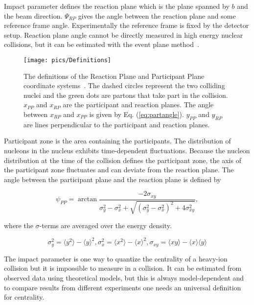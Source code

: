 Impact parameter defines the reaction plane which is the plane spanned by $b$ and the beam direction. $\Psi_{RP}$ gives the angle between the reaction plane and some reference frame angle. Experimentally the reference frame is fixed by the detector setup. Reaction plane angle cannot be directly measured in high energy nuclear collisions, but it can be estimated with the event plane method~\cite{Voloshin:2008dg}. 
\begin{figure}[h!]
\centering
\texttt{[image: pics/Definitions]}
\caption[The definitions of the Reaction Plane and Participant Plane coordinate systems]{The definitions of the Reaction Plane and Participant Plane coordinate systems~\cite{Voloshin:2007pc}. The dashed circles represent the two colliding nuclei and the green dots are partons that take part  in the collision. $x_{PP}$ and $x_{RP}$ are the participant and reaction planes. The angle between $x_{RP}$ and $x_{PP}$ is given by Eq. (\ref{eq:partangle}). $y_{PP}$ and $y_{RP}$ are lines perpendicular to the participant and reaction planes. }
\label{fig:planes}
\end{figure}


Participant zone is the area containing the participants. The distribution of nucleons in the nucleus exhibits time-dependent fluctuations. Because the nucleon distribution at the time of the collision defines the participant zone, the axis of the participant zone fluctuates and can deviate from the reaction plane. The angle between the participant plane and the reaction plane is defined by ~\cite{Holopainen:2010gz}

\begin{equation}
\psi_{PP}=\arctan \frac{-2\sigma_{xy}}{\sigma_y^2-\sigma_x^2+\sqrt{\left(\sigma_y^2-\sigma_x^2\right)^2+4\sigma_{xy}^2}},
\label{eq:partangle}
\end{equation}

\noindent where the $\sigma$-terms are averaged over the energy density.

\begin{equation}
\sigma_y^2=\langle y^2\rangle-\langle y \rangle ^2, \sigma_x^2=\langle x^2\rangle-\langle x \rangle ^2, \sigma_{xy}=\langle xy \rangle - \langle x \rangle \langle y \rangle
\end{equation}

The impact parameter is one way to quantize the centrality of a heavy-ion collision but it is impossible to measure in a collision. It can be estimated from observed data using theoretical models, but this is always model-dependent and to compare results from different experiments one needs an universal definition for centrality. %


